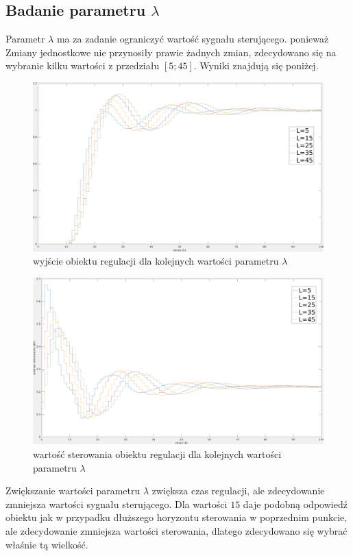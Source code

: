 \documentclass[fleqn]{article}
\begin{document}
\subsection{Badanie parametru $\lambda$}

	Parametr $\lambda$ ma za zadanie ograniczyć wartość sygnału sterującego. ponieważ  Zmiany jednostkowe nie przynosiły prawie żadnych zmian, zdecydowano się na wybranie kilku wartości z przedziału $[5;45]$. Wyniki znajdują się poniżej.

	\begin{figure}[H]
		\includegraphics[width=\textwidth]{scripts/zadanie5dwyjscie2.png}
		\caption{wyjście obiektu regulacji dla kolejnych wartości parametru $\lambda$}
	\end{figure}
	\begin{figure}[H]
		\includegraphics[width=\textwidth]{scripts/zadanie5dster2.png}
		\caption{wartość sterowania obiektu regulacji dla kolejnych wartości parametru $\lambda$}
	\end{figure}

	Zwiększanie wartości parametru $\lambda$ zwiększa czas regulacji, ale zdecydowanie zmniejsza wartości sygnału sterującego. Dla wartości $15$ daje podobną odpowiedź obiektu jak w przypadku dłuższego horyzontu sterowania w poprzednim punkcie, ale zdecydowanie zmniejsza wartości sterowania, dlatego zdecydowano się wybrać właśnie tą wielkość.
\end{document}
